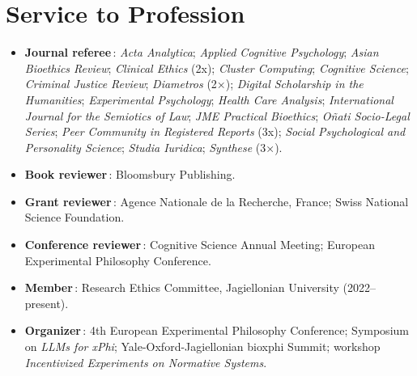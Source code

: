\documentclass{resume}
\begin{document}
\section{Service to Profession}
\begin{content}
\begin{itemize}[leftmargin=*, itemsep=0.4em]
  \item \textbf{Journal referee}\,: \emph{Acta Analytica}; \emph{Applied Cognitive Psychology}; \emph{Asian Bioethics Review}; \emph{Clinical Ethics} (2x); \emph{Cluster Computing}; \emph{Cognitive Science}; \emph{Criminal Justice Review}; \emph{Diametros} (2×); \emph{Digital Scholarship in the Humanities}; \emph{Experimental Psychology}; \emph{Health Care Analysis}; \emph{International Journal for the Semiotics of Law}; \emph{JME Practical Bioethics}; \emph{Oñati Socio-Legal Series}; \emph{Peer Community in Registered Reports} (3x); \emph{Social Psychological and Personality Science}; \emph{Studia Iuridica}; \emph{Synthese} (3×).

  \item \textbf{Book reviewer}\,: Bloomsbury Publishing.
  
  \item \textbf{Grant reviewer}\,: Agence Nationale de la Recherche, France; Swiss National Science Foundation.
  
  \item \textbf{Conference reviewer}\,: Cognitive Science Annual Meeting; European Experimental Philosophy Conference.
  
  \item \textbf{Member}\,: Research Ethics Committee, Jagiellonian University (2022–present).

  \item \textbf{Organizer}\,: 4th European Experimental Philosophy Conference; Symposium on \emph{LLMs for xPhi}; Yale-Oxford-Jagiellonian bioxphi Summit; workshop \emph{Incentivized Experiments on Normative Systems}.

\end{itemize}
\sectionlineskip
\end{content}

\end{document}
